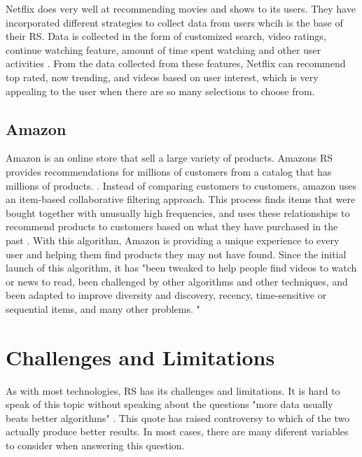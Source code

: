 \documentclass[sigconf]{acmart}
\begin{document}
Netflix does very well at recommending movies and shows to its users. They have incorporated different strategies to collect data from users whcih is the base of their RS. Data is collected in the form of customized search, video ratings, continue watching feature, amount of time spent watching and other user activities \cite{Gomez-Uribe2015}. From the data collected from these features, Netflix can recommend top rated, now trending, and videos based on user interest, which is very appealing to the user when there are so many selections to choose from.

\subsection{Amazon}
Amazon is an online store that sell a large variety of products. Amazons RS provides recommendations for millions of customers from a catalog that has millions of products. \cite{Smith2017}. Instead of comparing customers to customers, amazon uses an item-based collaborative filtering approach. This process finds items that were bought together with unusually high frequencies, and uses these relationships to recommend products to customers based on what they have purchased in the past \cite{Smith2017}. With this algorithm, Amazon is providing a unique experience to every user and helping them find products they may not have found. Since the initial launch of this algorithm, it has "been tweaked to help people find videos to watch or news to read, been challenged by other algorithms and other techniques, and been adapted to improve diversity and discovery, recency, time-sensitive or sequential items, and many other problems. " \cite{Smith2017}

\section{Challenges and Limitations}
As with most technologies, RS has its challenges and limitations. It is hard to speak of this topic without speaking about the questions "more data usually beats better algorithms" \cite{Rajaraman2008}. This quote has raised controversy to which of the two actually produce better results. In most cases, there are many diferent variables to consider when answering this question. 
\end{document}
